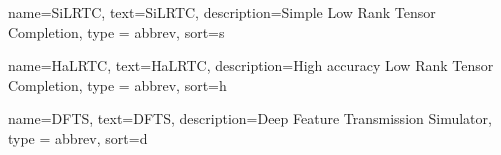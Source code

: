 

\makeglossaries

%
{%
	name={SiLRTC},
	text={SiLRTC},
	description={Simple Low Rank Tensor Completion},
	type = {abbrev},
	sort={s}
}

%
{%
	name={HaLRTC},
	text={HaLRTC},
	description={High accuracy Low Rank Tensor Completion},
	type = {abbrev},
	sort={h}
}

%
{%
	name={DFTS},
	text={DFTS},
	description={Deep Feature Transmission Simulator},
	type = {abbrev},
	sort={d}
}


